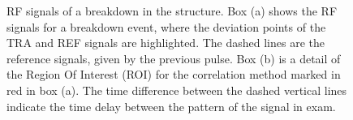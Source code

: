  \begin{figure}[h]
\centering
   \hspace{1mm}
\caption{RF signals of a breakdown in the structure. Box (a) shows the RF signals for a breakdown event, where the deviation points of the TRA and REF signals are highlighted. The dashed lines are the reference signals, given by the previous pulse. Box (b) is a detail of the Region Of Interest (ROI) for the correlation method marked in red in box (a). The time difference between the dashed vertical lines indicate the time delay between the pattern of the signal in exam.}
 \label{dev_pt}
 \end{figure}


